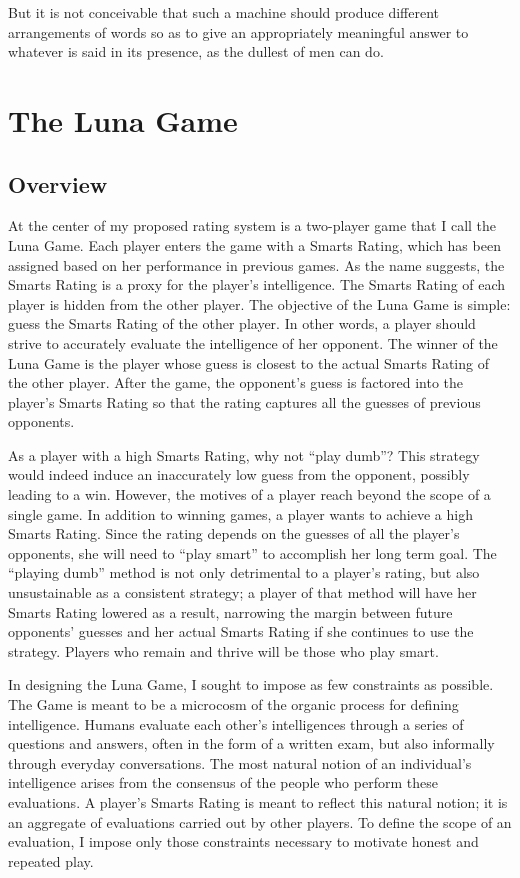 \begin{savequote}[75mm]
But it is not conceivable that such a machine should produce different arrangements of words so as to give an appropriately meaningful answer to whatever is said in its presence, as the dullest of men can do.
\end{savequote}

\chapter{The Luna Game}

\section{Overview}

At the center of my proposed rating system is a two-player game that I call the Luna Game. Each player enters the game with a Smarts Rating, which has been assigned based on her performance in previous games. As the name suggests, the Smarts Rating is a proxy for the player's intelligence. The Smarts Rating of each player is hidden from the other player. The objective of the Luna Game is simple: guess the Smarts Rating of the other player. In other words, a player should strive to accurately evaluate the intelligence of her opponent. The winner of the Luna Game is the player whose guess is closest to the actual Smarts Rating of the other player. After the game, the opponent's guess is factored into the player's Smarts Rating so that the rating captures all the guesses of previous opponents.

As a player with a high Smarts Rating, why not ``play dumb''? This strategy would indeed induce an inaccurately low guess from the opponent, possibly leading to a win. However, the motives of a player reach beyond the scope of a single game. In addition to winning games, a player wants to achieve a high Smarts Rating. Since the rating depends on the guesses of all the player's opponents, she will need to ``play smart'' to accomplish her long term goal. The ``playing dumb'' method is not only detrimental to a player's rating, but also unsustainable as a consistent strategy; a player of that method will have her Smarts Rating lowered as a result, narrowing the margin between future opponents' guesses and her actual Smarts Rating if she continues to use the strategy. Players who remain and thrive will be those who play smart.

In designing the Luna Game, I sought to impose as few constraints as possible. The Game is meant to be a microcosm of the organic process for defining intelligence. Humans evaluate each other's intelligences through a series of questions and answers, often in the form of a written exam, but also informally through everyday conversations. The most natural notion of an individual's intelligence arises from the consensus of the people who perform these evaluations. A player's Smarts Rating is meant to reflect this natural notion; it is an aggregate of evaluations carried out by other players. To define the scope of an evaluation, I impose only those constraints necessary to motivate honest and repeated play.

